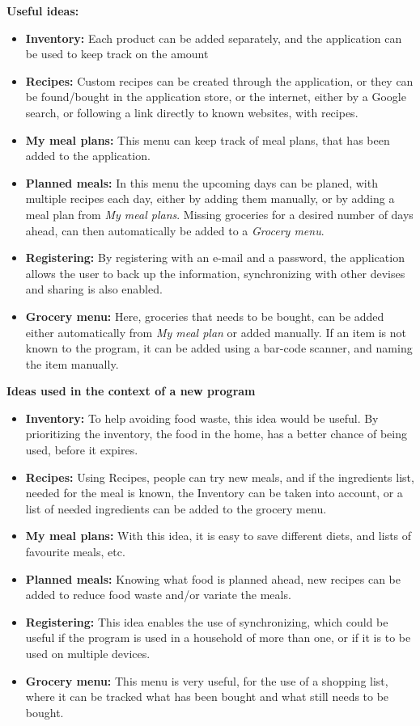 \textbf{Useful ideas:}
\begin{itemize}
  \item \textbf{Inventory:} Each product can be added separately, and the application can be used to keep track on the amount
  \item \textbf{Recipes:} Custom recipes can be created through the application, or they can be found/bought in the application store, or the internet, either by a Google search, or following a link directly to known websites, with recipes.
  \item \textbf{My meal plans:} This menu can keep track of meal plans, that has been added to the application.
  \item \textbf{Planned meals:} In this menu the upcoming days can be planed, with multiple recipes each day, either by adding them manually, or by adding a meal plan from \textit{My meal plans}. Missing groceries for a desired number of days ahead, can then automatically be added to a \textit{Grocery menu}.
  \item \textbf{Registering:} By registering with an e-mail and a password, the application allows the user to back up the information, synchronizing with other devises and sharing is also enabled.
  \item \textbf{Grocery menu:} Here, groceries that needs to be bought, can be added either automatically from \textit{My meal plan} or added manually. If an item is not known to the program, it can be added using a bar-code scanner, and naming the item manually.
\end{itemize}

\textbf{Ideas used in the context of a new program}
\begin{itemize}
  \item \textbf{Inventory:} To help avoiding food waste, this idea would be useful. By prioritizing the inventory, the food in the home, has a better chance of being used, before it expires.
  \item \textbf{Recipes:} Using Recipes, people can try new meals, and if the ingredients list, needed for the meal is known, the Inventory can be taken into account, or a list of needed ingredients can be added to the grocery menu.
  \item \textbf{My meal plans:} With this idea, it is easy to save different diets, and lists of favourite meals, etc.
  \item \textbf{Planned meals:} Knowing what food is planned ahead, new recipes can be added to reduce food waste and/or variate the meals.
  \item \textbf{Registering:} This idea enables the use of synchronizing, which could be useful if the program is used in a household of more than one, or if it is to be used on multiple devices.
  \item \textbf{Grocery menu:} This menu is very useful, for the use of a shopping list, where it can be tracked what has been bought and what still needs to be bought.
\end{itemize}


